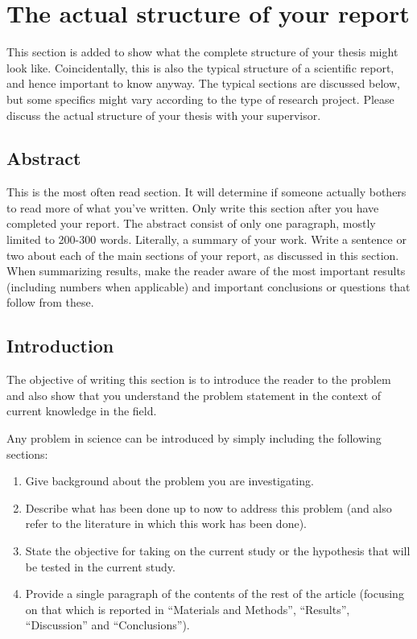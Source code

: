 \section{The actual structure of your report} %
\label{sec:developments}

This section is added to show what the complete structure of your thesis
might look like. Coincidentally, this is also the typical structure of a scientific report, and hence important to know anyway. 
The typical sections are discussed below, but some specifics might vary according to the type of research project. Please discuss the actual structure of your thesis with your supervisor.

\subsection{Abstract}
\label{sec:Abstract}
This is the most often read section. It will determine if someone actually bothers to read more
of what you've written. Only write this section after you have completed your
report. The abstract consist of only one paragraph, mostly limited
to 200-300 words. Literally, a summary of your work. Write a sentence
or two about each of the main sections of your report, as discussed in this section. When
summarizing results, make the reader aware of the most important results (including numbers when applicable)
and important conclusions or questions that follow from these.


\subsection{Introduction}
\label{sec:Introduction}
The objective of writing this section is to introduce the reader to
the problem and also show that you understand the problem statement
in the context of current knowledge in the field.

Any problem in science can be introduced by simply including the following
sections:
\begin{enumerate}
\item Give background about the problem you are investigating. 
\item Describe what has been done up to now to address this problem (and
also refer to the literature in which this work has been done). 
\item State the objective for taking on the current study or the hypothesis
that will be tested in the current study. 
\item Provide a single paragraph of the contents of the rest of the article
(focusing on that which is reported in \textquotedblleft{}Materials and Methods\textquotedblright{},
\textquotedblleft{}Results\textquotedblright{}, \textquotedblleft{}Discussion\textquotedblright{}
and \textquotedblleft{}Conclusions\textquotedblright{}).
\end{enumerate}

